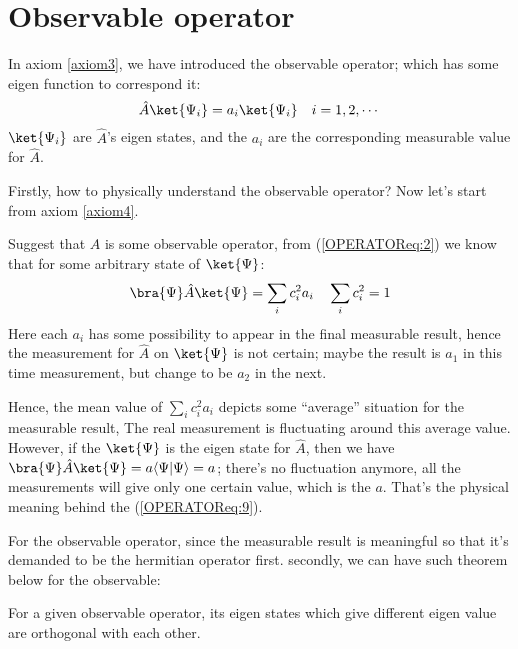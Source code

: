 \section{Observable operator}
%
%
%
%
In axiom \ref{axiom3}, we have introduced the observable operator;
which has some eigen function to correspond it:
\begin{equation}\label{OPERATOReq:1}
\hat{A}\ket{\Psi_{i}} = a_{i}\ket{\Psi_{i}} \quad i=1, 2, \cdots
\end{equation}
$\ket{\Psi_{i}}$ are $\hat{A}$'s eigen states, and the $a_{i}$ are
the corresponding measurable value for $\hat{A}$.

Firstly, how to physically understand the observable operator? Now
let's start from axiom \ref{axiom4}.

Suggest that $\hat{A}$ is some observable operator, from
(\ref{OPERATOReq:2}) we know that for some arbitrary state of
$\ket{\Psi}$:
\begin{equation}\label{OPERATOReq:9}
\bra{\Psi}\hat{A}\ket{\Psi} = \sum_{i}c_{i}^{2}a_{i} \quad
\sum_{i}c_{i}^{2} = 1
\end{equation}
Here each $a_{i}$ has some possibility to appear in the final
measurable result, hence the measurement for $\hat{A}$ on
$\ket{\Psi}$ is not certain; maybe the result is $a_{1}$ in this
time measurement, but change to be $a_{2}$ in the next.

Hence, the mean value of $\sum_{i}c_{i}^{2}a_{i}$ depicts some
``average'' situation for the measurable result, The real
measurement is fluctuating around this average value. However, if
the $\ket{\Psi}$ is the eigen state for $\hat{A}$, then we have
$\bra{\Psi}\hat{A}\ket{\Psi} = a\langle\Psi|\Psi\rangle =a$; there's
no fluctuation anymore, all the measurements will give only one
certain value, which is the $a$. That's the physical meaning behind
the (\ref{OPERATOReq:9}).

For the observable operator, since the measurable result is
meaningful so that it's demanded to be the hermitian operator first.
secondly, we can have such theorem below for the observable:

\begin{theorem}\label{OPERATOR:3}
For a given observable operator, its eigen states which give
different eigen value are orthogonal with each other.
\end{theorem}

